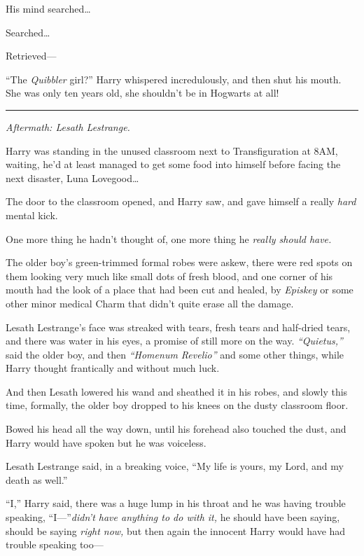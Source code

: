 His mind searched\ldots{}

Searched\ldots{}

Retrieved---

``The \emph{Quibbler} girl?'' Harry whispered incredulously, and then
shut his mouth. She was only ten years old, she shouldn't be in Hogwarts
at all!

\begin{center}\rule{3in}{0.4pt}\end{center}

\emph{Aftermath: Lesath Lestrange.}

Harry was standing in the unused classroom next to Transfiguration at
8AM, waiting, he'd at least managed to get some food into himself before
facing the next disaster, Luna Lovegood\ldots{}

The door to the classroom opened, and Harry saw, and gave himself a
really \emph{hard} mental kick.

One more thing he hadn't thought of, one more thing he \emph{really
should have.}

The older boy's green-trimmed formal robes were askew, there were red
spots on them looking very much like small dots of fresh blood, and one
corner of his mouth had the look of a place that had been cut and
healed, by \emph{Episkey} or some other minor medical Charm that didn't
quite erase all the damage.

Lesath Lestrange's face was streaked with tears, fresh tears and
half-dried tears, and there was water in his eyes, a promise of still
more on the way. \emph{``Quietus,''} said the older boy, and then
\emph{``Homenum Revelio''} and some other things, while Harry thought
frantically and without much luck.

And then Lesath lowered his wand and sheathed it in his robes, and
slowly this time, formally, the older boy dropped to his knees on the
dusty classroom floor.

Bowed his head all the way down, until his forehead also touched the
dust, and Harry would have spoken but he was voiceless.

Lesath Lestrange said, in a breaking voice, ``My life is yours, my Lord,
and my death as well.''

``I,'' Harry said, there was a huge lump in his throat and he was having
trouble speaking, ``I---''\emph{didn't have anything to do with it,} he
should have been saying, should be saying \emph{right now,} but then
again the innocent Harry would have had trouble speaking too---


